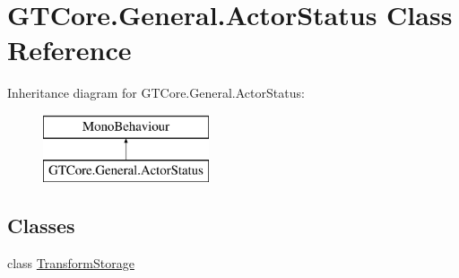 \hypertarget{class_g_t_core_1_1_general_1_1_actor_status}{}\section{G\+T\+Core.\+General.\+Actor\+Status Class Reference}
\label{class_g_t_core_1_1_general_1_1_actor_status}
Inheritance diagram for G\+T\+Core.\+General.\+Actor\+Status\+:\begin{figure}[H]
\begin{center}
\leavevmode
\includegraphics[height=2.000000cm]{class_g_t_core_1_1_general_1_1_actor_status}
\end{center}
\end{figure}
\subsection*{Classes}
\begin{DoxyCompactItemize}
\item 
class \hyperlink{class_g_t_core_1_1_general_1_1_actor_status_1_1_transform_storage}{Transform\+Storage}
\end{DoxyCompactItemize}
